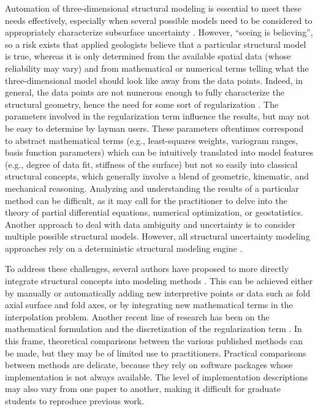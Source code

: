 \documentclass[preprint]{ring20}
\begin{document}
Automation of three-dimensional structural modeling is essential to meet these needs effectively, especially when several possible models need to be considered to appropriately characterize subsurface uncertainty \citep{Wellmann2018AiG}. However, ``seeing is believing'', so a risk exists that applied geologists believe that a particular structural model is true, whereas it is only determined from the available spatial data (whose reliability may vary) and from mathematical or numerical terms telling what the three-dimensional model should look like away from the data points. Indeed, in general, the data points are not numerous enough to fully characterize the structural geometry, hence the need for some sort of regularization \citep[e.g.,][]{Renaudeau2019MG}. The parameters involved in the regularization term influence the results, but may not be easy to determine by layman users. These parameters oftentimes correspond to abstract mathematical terms (e.g., least-squares weights, variogram ranges, basis function parameters) which can be intuitively translated into model features (e.g., degree of data fit, stiffness of the surface) but not so easily into classical structural concepts, which generally involve a blend of geometric, kinematic, and mechanical reasoning. Analyzing and understanding the results of a particular method can be difficult, as it may call for the practitioner to delve into the theory of partial differential equations, numerical optimization, or geostatistics. Another approach to deal with data ambiguity and uncertainty is to consider multiple possible structural models. However, all structural uncertainty modeling approaches rely on a deterministic structural modeling engine \citep[see ][ and references therein]{Wellmann2018AiG}.  

To address these challenges, several authors have proposed to more directly integrate structural concepts into modeling methods \citep{DeKemp2003G,Maxelon2009CG,MassiotGM2010,Laurent2016EaPSL,Grose2017JSG,Grose2018JGRSE,Grose2019JoSG,Pizzella2022MG}. This can be achieved either by manually or automatically adding new interpretive points or data such as fold axial surface and fold axes, or by integrating new mathematical terms in the interpolation problem. Another recent line of research has been on the mathematical formulation and the discretization of the regularization term \citep{Laurent2016MG,Martin2017CG,Renaudeau2019MG,Irakarama2021MG,Irakarama2022CD}. In this frame, theoretical comparisons between the various published methods can be made, but they may be of limited use to practitioners. Practical comparisons between methods are delicate, because they rely on software packages whose implementation is not always available. The level of implementation descriptions may also vary from one paper to another, making it difficult for graduate students to reproduce previous work. 
\end{document}
